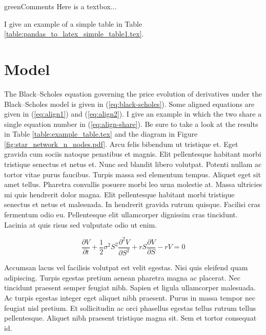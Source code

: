 \documentclass[12pt]{article}
\begin{document}
\begin{textbox}{green}{Comments}
Here is a textbox...
\end{textbox}

I give an example of a simple table in Table \ref{table:pandas_to_latex_simple_table1.tex}.


\begin{table}
\caption{A Simple Table From Pandas, No. 1}
\centering
{}
\caption*{
  Here I show some data...
}
\label{table:pandas_to_latex_simple_table1.tex}
\end{table}


\section{Model}

The Black–Scholes equation governing the price evolution of derivatives under
the Black–Scholes model is given in (\ref{eq:black-scholes}). Some aligned
equations are given in (\ref{eq:align1}) and (\ref{eq:align2}). I give an
example in which the two share a single equation number in
(\ref{eq:align-share}). Be sure to take a look at the results in 
Table \ref{table:example_table.tex} and the diagram in 
Figure \ref{fig:star_network_n_nodes.pdf}.
Arcu felis bibendum ut tristique et. Eget gravida
cum sociis natoque penatibus et magnis. Elit pellentesque habitant morbi
tristique senectus et netus et.
Nunc sed blandit libero volutpat.
Potenti nullam ac tortor vitae purus faucibus. Turpis massa sed elementum
tempus. Aliquet eget sit amet tellus. Pharetra convallis posuere morbi leo
urna molestie at. Massa ultricies mi quis hendrerit dolor magna. Elit
pellentesque habitant morbi tristique senectus et netus et malesuada. In
hendrerit gravida rutrum quisque. Facilisi cras fermentum odio eu.
Pellentesque elit ullamcorper dignissim cras tincidunt. Lacinia at quis
risus sed vulputate odio ut enim. 

\begin{equation}
\frac{\partial V}{\partial t} + \frac{1}{2}\sigma^2 S^2 \frac{\partial^2 V}{\partial S^2} 
+ rS\frac{\partial V}{\partial S} - rV = 0
\label{eq:black-scholes}
\end{equation}

Accumsan lacus vel facilisis volutpat est velit egestas. Nisi quis eleifend
quam adipiscing. Turpis egestas pretium aenean pharetra magna ac placerat.
Nec tincidunt praesent semper feugiat nibh. Sapien et ligula ullamcorper
malesuada. Ac turpis egestas integer eget aliquet nibh praesent. Purus in
massa tempor nec feugiat nisl pretium. Et sollicitudin ac orci phasellus
egestas tellus rutrum tellus pellentesque. Aliquet nibh praesent tristique
magna sit. Sem et tortor consequat id.
\end{document}
